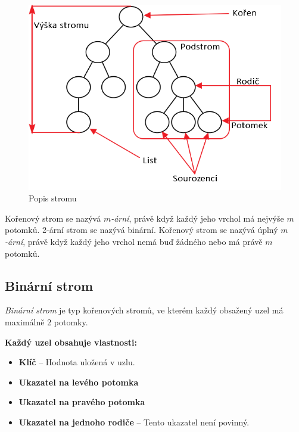 \documentclass[
  biblatex=false,
  font=serif,
  glossaries=false,
  tables=false,
  theorems=false,
  index
]{kidiplom}
\begin{document}
\begin{figure}[h!]
\centering
	\includegraphics[scale=0.6]{obrazky/2PopisStromu.png}
	\caption{Popis stromu}
\end{figure}

\begin{definition}
Kořenový strom se nazývá $m$\textit{-ární}, právě když každý jeho vrchol má nejvýše $m$ potomků. 2-ární strom se nazývá binární. Kořenový strom se nazývá úplný $m$\textit{-ární}, právě když každý jeho vrchol nemá buď žádného nebo má právě $m$ potomků.\cite{belohlavekVychodil}
\end{definition}
\smallskip

\subsection{Binární strom}
\begin{definition}
\textit{Binární strom} je typ kořenových stromů, ve kterém každý obsažený uzel má maximálně 2 potomky.
\end{definition}
\smallskip

\noindent\textbf{Každý uzel obsahuje vlastnosti:}
\begin{itemize}
\item \textbf{Klíč} -- Hodnota uložená v uzlu.
\item \textbf{Ukazatel na levého potomka}
\item \textbf{Ukazatel na pravého potomka}
\item \textbf{Ukazatel na jednoho rodiče} -- Tento ukazatel není povinný.
\end{itemize}
\end{document}
